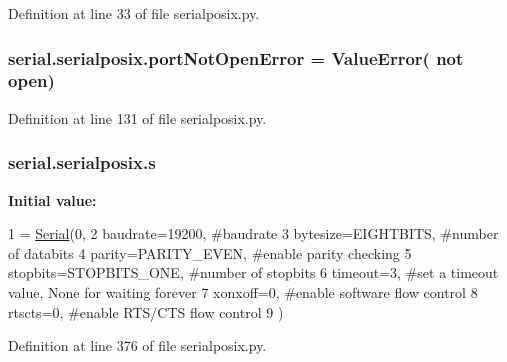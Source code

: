 Definition at line 33 of file serialposix.\+py.

\subsubsection[{\texorpdfstring{port\+Not\+Open\+Error}{portNotOpenError}}]{\setlength{\rightskip}{0pt plus 5cm}serial.\+serialposix.\+port\+Not\+Open\+Error = Value\+Error( not open\textquotesingle{})}\hypertarget{namespaceserial_1_1serialposix_abbf54b033525de3ce2c3bc3dd427c572}{}\label{namespaceserial_1_1serialposix_abbf54b033525de3ce2c3bc3dd427c572}


Definition at line 131 of file serialposix.\+py.

\subsubsection[{\texorpdfstring{s}{s}}]{\setlength{\rightskip}{0pt plus 5cm}serial.\+serialposix.\+s}\hypertarget{namespaceserial_1_1serialposix_af9c46eecd92c16ec0132591690404e3a}{}\label{namespaceserial_1_1serialposix_af9c46eecd92c16ec0132591690404e3a}
{\bfseries Initial value\+:}
\begin{DoxyCode}
1 = \hyperlink{classserial_1_1serialposix_1_1_serial}{Serial}(0,
2                  baudrate=19200,        \textcolor{comment}{#baudrate}
3                  bytesize=EIGHTBITS,    \textcolor{comment}{#number of databits}
4                  parity=PARITY\_EVEN,    \textcolor{comment}{#enable parity checking}
5                  stopbits=STOPBITS\_ONE, \textcolor{comment}{#number of stopbits}
6                  timeout=3,             \textcolor{comment}{#set a timeout value, None for waiting forever}
7                  xonxoff=0,             \textcolor{comment}{#enable software flow control}
8                  rtscts=0,              \textcolor{comment}{#enable RTS/CTS flow control}
9                )
\end{DoxyCode}


Definition at line 376 of file serialposix.\+py.

